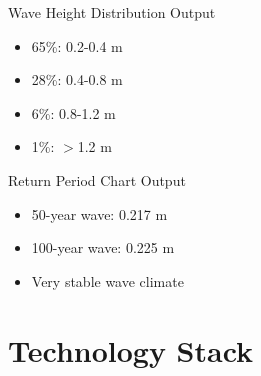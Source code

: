 \documentclass[10pt]{beamer}
\begin{document}
\begin{frame}{Wave Height Distribution Output}
\begin{center}
\end{center}

\begin{itemize}
    \item 65\%: 0.2-0.4 m
    \item 28\%: 0.4-0.8 m
    \item 6\%: 0.8-1.2 m
    \item 1\%: $>$1.2 m
\end{itemize}
\end{frame}

\begin{frame}{Return Period Chart Output}
\begin{center}
\end{center}

\begin{itemize}
    \item 50-year wave: 0.217 m
    \item 100-year wave: 0.225 m
    \item Very stable wave climate
\end{itemize}
\end{frame}

\section{Technology Stack}
\end{document}
